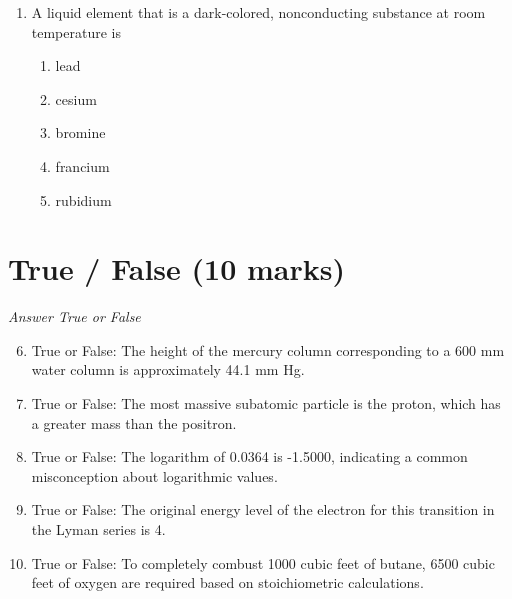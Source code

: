 \documentclass[12pt]{article}
\begin{document}
\begin{enumerate}[label=\arabic*.]
\begin{enumerate}[label=(\alph*)]
    \item 169 $\mathrm{g} \mathrm{mol}^{-1}$
    \item 123 $\mathrm{g} \mathrm{mol}^{-1}$
    \item 200 $\mathrm{g} \mathrm{mol}^{-1}$
    \item 150 $\mathrm{g} \mathrm{mol}^{-1}$
    \item 190 $\mathrm{g} \mathrm{mol}^{-1}$
\end{enumerate}
\item A liquid element that is a dark-colored, nonconducting substance at room temperature is
\begin{enumerate}[label=(\alph*)]
    \item lead
    \item cesium
    \item bromine
    \item francium
    \item rubidium
\end{enumerate}
\end{enumerate}

\section*{True / False (10 marks)}
\textit{Answer True or False}
\begin{enumerate}[label=\arabic*.]
\setcounter{enumi}{5}
\item True or False: The height of the mercury column corresponding to a 600 mm water column is approximately 44.1 mm Hg.
\item True or False: The most massive subatomic particle is the proton, which has a greater mass than the positron.
\item True or False: The logarithm of 0.0364 is -1.5000, indicating a common misconception about logarithmic values.
\item True or False: The original energy level of the electron for this transition in the Lyman series is 4.
\item True or False: To completely combust 1000 cubic feet of butane, 6500 cubic feet of oxygen are required based on stoichiometric calculations.
\end{enumerate}
\end{document}
